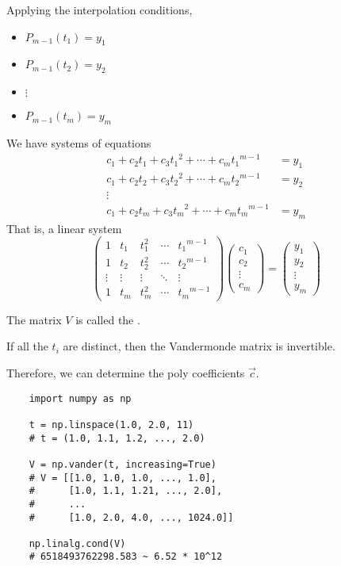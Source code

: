 Applying the interpolation conditions,
\begin{itemize}
    \item \( P_{m-1}(t_1) = y_1 \)
    \item \( P_{m-1}(t_2) = y_2 \)
    \item \( \vdots \)
    \item \( P_{m-1}(t_m) = y_m \)
\end{itemize}
We have systems of equations
\begin{align*}
    c_1 + c_2 t_1 + c_3 {t_1}^2 + \cdots + c_m {t_1}^{m-1} & = y_1 \\
    c_1 + c_2 t_2 + c_3 {t_2}^2 + \cdots + c_m {t_2}^{m-1} & = y_2 \\
    \vdots                                                         \\
    c_1 + c_2 t_m + c_3 {t_m}^2 + \cdots + c_m {t_m}^{m-1} & = y_m
\end{align*}
That is, a linear system \[
    \begin{pmatrix}
        1      & t_1    & t_1^2  & \cdots & {t_1}^{m-1} \\
        1      & t_2    & t_2^2  & \cdots & {t_2}^{m-1} \\
        \vdots & \vdots & \vdots & \ddots & \vdots      \\
        1      & t_m    & t_m^2  & \cdots & {t_m}^{m-1}
    \end{pmatrix} \begin{pmatrix}
        c_1    \\
        c_2    \\
        \vdots \\
        c_m
    \end{pmatrix} = \begin{pmatrix}
        y_1    \\
        y_2    \\
        \vdots \\
        y_m
    \end{pmatrix}
\]

The matrix \( V \) is called the .

\begin{lemma}
    If all the \( t_i \) are distinct, then the Vandermonde matrix is invertible.
\end{lemma}

Therefore, we can determine the poly coefficients \( \vec{c} \).

\begin{verbatim}
    import numpy as np

    t = np.linspace(1.0, 2.0, 11)
    # t = (1.0, 1.1, 1.2, ..., 2.0)

    V = np.vander(t, increasing=True)
    # V = [[1.0, 1.0, 1.0, ..., 1.0],
    #      [1.0, 1.1, 1.21, ..., 2.0],
    #      ...
    #      [1.0, 2.0, 4.0, ..., 1024.0]]

    np.linalg.cond(V)
    # 6518493762298.583 ~ 6.52 * 10^12
\end{verbatim}

